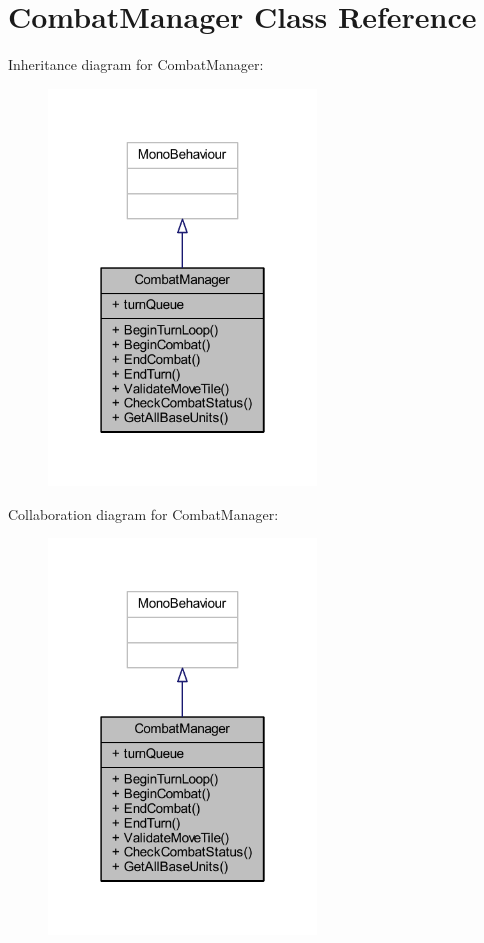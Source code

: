 \hypertarget{class_combat_manager}{}\section{Combat\+Manager Class Reference}
\label{class_combat_manager}


Inheritance diagram for Combat\+Manager\+:\nopagebreak
\begin{figure}[H]
\begin{center}
\leavevmode
\includegraphics[width=202pt]{class_combat_manager__inherit__graph}
\end{center}
\end{figure}


Collaboration diagram for Combat\+Manager\+:\nopagebreak
\begin{figure}[H]
\begin{center}
\leavevmode
\includegraphics[width=202pt]{class_combat_manager__coll__graph}
\end{center}
\end{figure}

